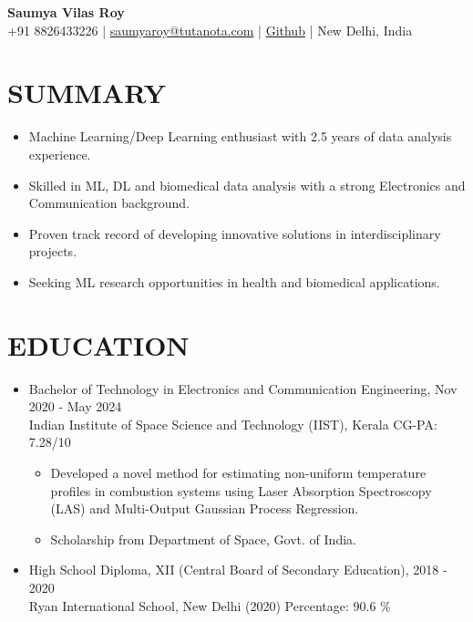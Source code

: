 \documentclass[11pt]{article}
\begin{document}
	
	\begin{center}
		{\huge\bf Saumya Vilas Roy} \\
		
		\vspace{3mm} %
		{\large
			+91 8826433226 |
			\href{mailto:saumyaroy@tutanota.com}{saumyaroy@tutanota.com} |
				\href{https://4d2.link/saumya}{Github} |
			New Delhi, India
		} \\
		{
	
		}
	\end{center}
	
	\section*{\bf SUMMARY}
	\begin{itemize}[leftmargin=*,noitemsep,topsep=0pt]
		\item Machine Learning/Deep Learning enthusiast with 2.5 years of data analysis experience.
		\item Skilled in ML, DL and biomedical data analysis with a strong Electronics and Communication background.
		\item Proven track record of developing innovative solutions in interdisciplinary projects.
		\item Seeking ML research opportunities in health and biomedical applications.
	\end{itemize}
	
	\section*{\bf EDUCATION}
	\begin{itemize}[leftmargin=*,noitemsep,topsep=0pt]
		\item Bachelor of Technology in Electronics and Communication Engineering, \hfill Nov 2020 - May 2024 \\
		Indian Institute of Space Science and Technology (IIST), Kerala \hfill CG-PA: 7.28/10
		\begin{itemize}[leftmargin=*,noitemsep,topsep=0pt]
			\item Developed a novel method for estimating non-uniform temperature profiles in combustion systems using Laser Absorption Spectroscopy (LAS) and Multi-Output Gaussian Process Regression.
			\item Scholarship from Department of Space, Govt. of India.
		\end{itemize}
		\item High School Diploma, XII (Central Board of Secondary Education), \hfill 2018 - 2020\\
		Ryan International School, New Delhi (2020)  \hfill Percentage: 90.6 \%
	\end{itemize}
	
\end{document}
